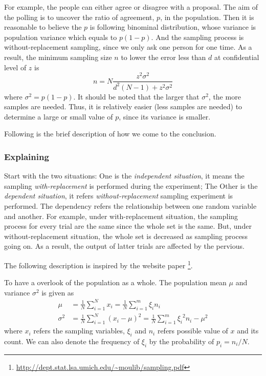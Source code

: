 For example, the people can either agree or disagree with a proposal.
The aim of the polling is to uncover the ratio of agreement, $p$, in the population.
Then it is reasonable to believe the $p$ is following binominal distribution,
whose variance is population variance which equals to $p(1-p)$.
And the sampling process is without-replacement sampling,
since we only ask one person for one time.
As a result, the minimum sampling size $n$ to lower the error less than $d$ at confidential level of $z$ is
\begin{equation*}
    n = N \frac{z^2 \sigma^2}{d^2 (N-1) + z^2 \sigma^2}
\end{equation*}
where $\sigma^2 = p(1-p)$.
It should be noted that the larger that $\sigma^2$, the more samples are needed.
Thus, it is relatively easier (less samples are needed) to determine a large or small value of $p$,
since its variance is smaller.

Following is the brief description of how we come to the conclusion.

\subsubsection{Explaining}

Start with the two situations:
One is the \emph{independent situation}, it means the sampling \emph{with-replacement} is performed during the experiment;
The Other is the \emph{dependent situation}, it refers \emph{without-replacement} sampling experiment is performed.
The dependency refers the relationship between one random variable and another.
For example, under with-replacement situation, the sampling process for every trial are the same since the whole set is the same.
But, under without-replacement situation, the whole set is decreased as sampling process going on.
As a result, the output of latter trials are affected by the pervious.

The following description is inspired by the website paper \footnote{\url{http://dept.stat.lsa.umich.edu/~moulib/sampling.pdf}}.

To have a overlook of the population as a whole.
The population mean $\mu$ and variance $\sigma^2$ is given as
\begin{align*}
    \mu      & = \frac{1}{N} \sum_{i=1}^{N} x_i = \frac{1}{N} \sum_{i=1}^{m} \xi_i n_i                       \\
    \sigma^2 & = \frac{1}{N} \sum_{i=1}^{N} (x_i - \mu)^2 = \frac{1}{N} \sum_{i=1}^{m} {\xi_i}^2 n_i - \mu^2
\end{align*}
where $x_i$ refers the sampling variables, $\xi_i$ and $n_i$ refers possible value of $x$ and its count.
We can also denote the frequency of $\xi_i$ by the probability of $p_i = n_i / N$.

